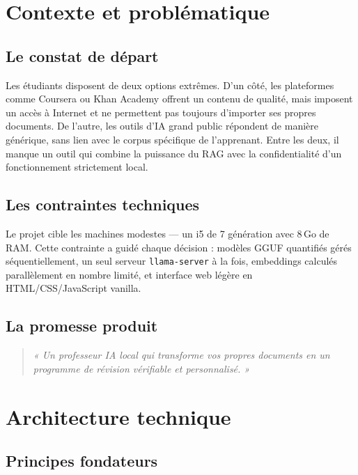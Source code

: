 \documentclass[11pt,a4paper]{article}
\begin{document}
\section{Contexte et problématique}

\subsection{Le constat de départ}

Les étudiants disposent de deux options extrêmes. D'un côté, les plateformes comme Coursera ou Khan Academy offrent un contenu de qualité, mais imposent un accès à Internet et ne permettent pas toujours d'importer ses propres documents. De l'autre, les outils d'IA grand public répondent de manière générique, sans lien avec le corpus spécifique de l'apprenant. Entre les deux, il manque un outil qui combine la puissance du RAG avec la confidentialité d'un fonctionnement strictement local.

\subsection{Les contraintes techniques}

Le projet cible les machines modestes --- un i5 de 7 génération avec 8\,Go de RAM. Cette contrainte a guidé chaque décision : modèles GGUF quantifiés gérés séquentiellement, un seul serveur \texttt{llama-server} à la fois, embeddings calculés parallèlement en nombre limité, et interface web légère en HTML/CSS/JavaScript vanilla.

\subsection{La promesse produit}

\begin{quote}
\textit{« Un professeur IA local qui transforme vos propres documents en un programme de révision vérifiable et personnalisé. »}
\end{quote}

\section{Architecture technique}

\subsection{Principes fondateurs}
\end{document}
